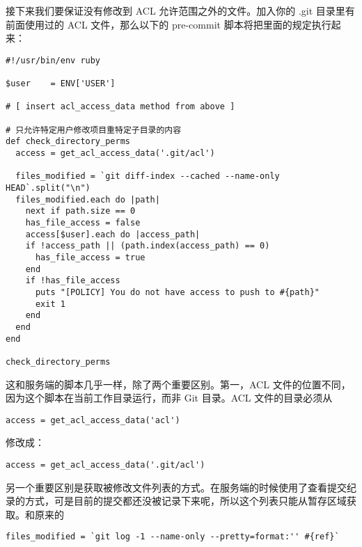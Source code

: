 \documentclass[a4paper]{book}
\begin{document}
接下来我们要保证没有修改到 ACL 允许范围之外的文件。加入你的 .git 目录里有前面使用过的 ACL 文件，那么以下的 pre-commit 脚本将把里面的规定执行起来：

\begin{shaded}\begin{verbatim}
#!/usr/bin/env ruby

$user    = ENV['USER']

# [ insert acl_access_data method from above ]

# 只允许特定用户修改项目重特定子目录的内容
def check_directory_perms
  access = get_acl_access_data('.git/acl')

  files_modified = `git diff-index --cached --name-only HEAD`.split("\n")
  files_modified.each do |path|
    next if path.size == 0
    has_file_access = false
    access[$user].each do |access_path|
    if !access_path || (path.index(access_path) == 0)
      has_file_access = true
    end
    if !has_file_access
      puts "[POLICY] You do not have access to push to #{path}"
      exit 1
    end
  end
end

check_directory_perms
\end{verbatim}\end{shaded}

这和服务端的脚本几乎一样，除了两个重要区别。第一，ACL 文件的位置不同，因为这个脚本在当前工作目录运行，而非 Git 目录。ACL 文件的目录必须从

\begin{shaded}\begin{verbatim}
access = get_acl_access_data('acl')
\end{verbatim}\end{shaded}

修改成：

\begin{shaded}\begin{verbatim}
access = get_acl_access_data('.git/acl')
\end{verbatim}\end{shaded}

另一个重要区别是获取被修改文件列表的方式。在服务端的时候使用了查看提交纪录的方式，可是目前的提交都还没被记录下来呢，所以这个列表只能从暂存区域获取。和原来的

\begin{shaded}\begin{verbatim}
files_modified = `git log -1 --name-only --pretty=format:'' #{ref}`
\end{verbatim}\end{shaded}
\end{document}
